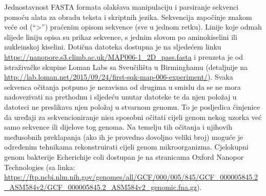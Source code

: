 \documentclass[conference]{IEEEtran}
\begin{document}
Jednostavnost FASTA formata olakšava manipulaciju i parsiranje sekvenci pomoću alata za obradu teksta i skriptnih jezika. Sekvencija započinje znakom veće od (“>”) praćenim opisom sekvence (sve u jednom retku). Linije koje odmah slijede liniju opisa su prikaz sekvence, s jednim slovom po aminokiselini ili nukleinskoj kiselini. Dotična datoteka dostupna je na sljedećem linku \url{https://nanopore.s3.climb.ac.uk/MAP006-1_2D_pass.fasta} i preuzeta je od istraživačke skupine Loman Labs sa Sveučilišta u Birminghamu (detaljnije na \url{http://lab.loman.net/2015/09/24/first-sqk-map-006-experiment/}). Svaka sekvenca očitanja potpuno je nezavisna od drugima u smislu da se ne mora nadovezivati na prethodnu i sljedeću unutar datoteke te da njen položaj u datoteci ne preslikava njen položaj u stvarnom genomu. To je posljedica činjenice da uređaji za sekvencioniranje nisu sposobni očitati cijeli genom nekog uzorka već samo sekvence ili dijelove tog genoma. Na temelju tih očitanja  i njihovih međusobnih preklapanja (ako ih je provedno dovoljno veliki broj) moguće je određenim tehnikama rekonstruirati cijeli genom mikroorganizma. Cjelokupni genom bakterije Echerichije coli dostupan je na stranicama Oxford Nanopor Technologies (sa linka: \url{https://ftp.ncbi.nlm.nih.gov/genomes/all/GCF/000/005/845/GCF_000005845.2_ASM584v2/GCF_000005845.2_ASM584v2_genomic.fna.gz}). 
\end{document}
